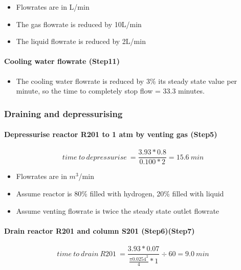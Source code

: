     \begin{itemize}
        \item Flowrates are in L/min
        \item The gas flowrate is reduced by 10L/min
        \item The liquid flowrate is reduced by 2L/min
    \end{itemize}
    
\paragraph{Cooling water flowrate (Step11)}
    \begin{itemize}
        \item The cooling water flowrate is reduced by 3\% its steady state value per minute, so the time to completely stop flow = 33.3 minutes.
    \end{itemize}
    
\subsubsection{Draining and depressurising}   
\paragraph{Depressurise reactor R201 to 1 atm by venting gas (Step5)}
    \begin{equation}
        time\:to\:depressurise\:=\frac{3.93 * 0.8}{0.100 * 2}=15.6\:min
    \end{equation}
    
    \begin{itemize}
        \item Flowrates are in $m^3$/min
        \item Assume reactor is 80\% filled with hydrogen, 20\% filled with liquid
        \item Assume venting flowrate is twice the steady state outlet flowrate
    \end{itemize}
    
\paragraph{Drain reactor R201 and column S201 (Step6)(Step7)}   

    \begin{equation}
        time\:to\:drain\:R201\:=\frac{3.93 * 0.07}{\frac{\pi 0.0254^2}{4} * 1} \div 60 =9.0\:min
    \end{equation}
    
